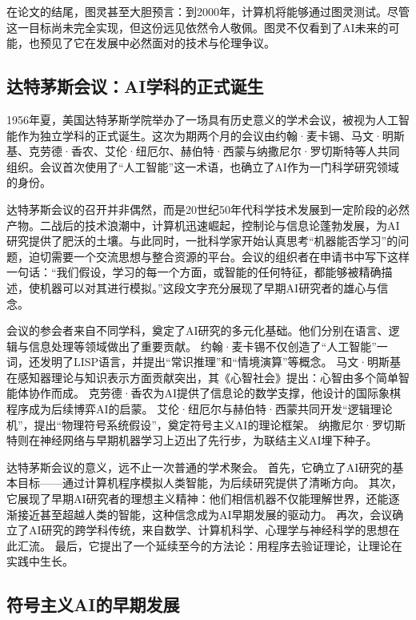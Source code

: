 在论文的结尾，图灵甚至大胆预言：到2000年，计算机将能够通过图灵测试。尽管这一目标尚未完全实现，但这份远见依然令人敬佩。图灵不仅看到了AI未来的可能，也预见了它在发展中必然面对的技术与伦理争议。

\subsection{达特茅斯会议：AI学科的正式诞生}

1956年夏，美国达特茅斯学院举办了一场具有历史意义的学术会议，被视为人工智能作为独立学科的正式诞生。这次为期两个月的会议由约翰·麦卡锡、马文·明斯基、克劳德·香农、艾伦·纽厄尔、赫伯特·西蒙与纳撒尼尔·罗切斯特等人共同组织。会议首次使用了“人工智能”这一术语，也确立了AI作为一门科学研究领域的身份。

达特茅斯会议的召开并非偶然，而是20世纪50年代科学技术发展到一定阶段的必然产物。二战后的技术浪潮中，计算机迅速崛起，控制论与信息论蓬勃发展，为AI研究提供了肥沃的土壤。与此同时，一批科学家开始认真思考“机器能否学习”的问题，迫切需要一个交流思想与整合资源的平台。会议的组织者在申请书中写下这样一句话：“我们假设，学习的每一个方面，或智能的任何特征，都能够被精确描述，使机器可以对其进行模拟。”这段文字充分展现了早期AI研究者的雄心与信念。

会议的参会者来自不同学科，奠定了AI研究的多元化基础。他们分别在语言、逻辑与信息处理等领域做出了重要贡献。  
约翰·麦卡锡不仅创造了“人工智能”一词，还发明了LISP语言，并提出“常识推理”和“情境演算”等概念。  
马文·明斯基在感知器理论与知识表示方面贡献突出，其《心智社会》提出：心智由多个简单智能体协作而成。  
克劳德·香农为AI提供了信息论的数学支撑，他设计的国际象棋程序成为后续博弈AI的启蒙。  
艾伦·纽厄尔与赫伯特·西蒙共同开发“逻辑理论机”，提出“物理符号系统假设”，奠定符号主义AI的理论框架。  
纳撒尼尔·罗切斯特则在神经网络与早期机器学习上迈出了先行步，为联结主义AI埋下种子。

达特茅斯会议的意义，远不止一次普通的学术聚会。  
首先，它确立了AI研究的基本目标——通过计算机程序模拟人类智能，为后续研究提供了清晰方向。  
其次，它展现了早期AI研究者的理想主义精神：他们相信机器不仅能理解世界，还能逐渐接近甚至超越人类的智能，这种信念成为AI早期发展的驱动力。  
再次，会议确立了AI研究的跨学科传统，来自数学、计算机科学、心理学与神经科学的思想在此汇流。  
最后，它提出了一个延续至今的方法论：用程序去验证理论，让理论在实践中生长。

\subsection{符号主义AI的早期发展}

